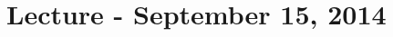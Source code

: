 \documentclass[12pt]{article}
\begin{document}
\section{Lecture - September 15, 2014}



\end{document}
